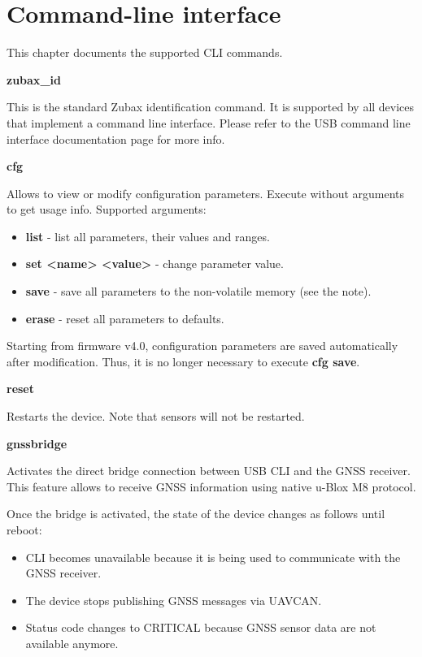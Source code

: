 \documentclass{zubaxdoc}
\begin{document}
\chapter{Command-line interface}\label{command-line_interface}

This chapter documents the supported CLI commands.

\textbf{zubax{\_}id}

This is the standard Zubax identification command. It is supported by all devices that implement a command line interface. Please refer to the USB command line interface documentation page for more info.

\textbf{cfg}

Allows to view or modify configuration parameters.
Execute without arguments to get usage info. Supported arguments:
\begin{itemize}
\item \textbf{list} - list all parameters, their values and ranges.
\item \textbf{set <name> <value>} - change parameter value.
\item \textbf{save} - save all parameters to the non-volatile memory (see the note).
\item \textbf{erase} - reset all parameters to defaults.
\end{itemize}

Starting from firmware v4.0, configuration parameters are saved automatically after modification. Thus, it is no longer necessary to execute \textbf{cfg save}.

\textbf{reset}

Restarts the device. Note that sensors will not be restarted.

\textbf{gnssbridge}

Activates the direct bridge connection between USB CLI and the GNSS receiver. This feature allows to receive GNSS information using native u-Blox M8 protocol.

Once the bridge is activated, the state of the device changes as follows until reboot:
\begin{itemize}
\item CLI becomes unavailable because it is being used to communicate with the GNSS receiver.
\item The device stops publishing GNSS messages via UAVCAN.
\item Status code changes to CRITICAL because GNSS sensor data are not available anymore.
\end{itemize}
\end{document}
